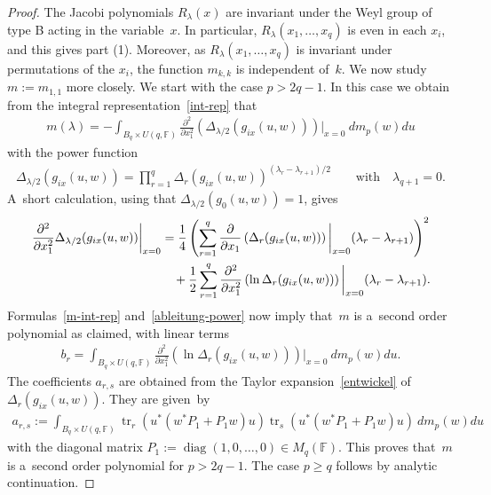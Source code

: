 \documentclass[11pt]{article}
\numberwithin{equation}{section}
\DeclareMathOperator{\diag}{diag}
\begin{document}
\begin{proof}
The Jacobi polynomials $R_\lambda(x)$ are invariant under the Weyl group of type B acting in the variable~$x$.
In particular, $R_\lambda(x_1,\ldots,x_q)$ is even in each $x_i$, and this gives part (1).
Moreover, as $R_\lambda(x_1,\ldots,x_q)$ is invariant under permutations of the $x_i$, the function $m_{k,k}$ is
independent of~$k$.
We now study $m:=m_{1,1}$ more closely.
We start with the case $p> 2q-1$.
In this case we obtain from the integral representation~\eqref{int-rep} that
\begin{gather}
\label{m-int-rep}
m(\lambda)= -\int_{B_q\times U(q,\mathbb F)} \frac{\partial^2}{\partial x_1^2}\left(\Delta_{\lambda/2}(g_{ix}(u,w))\right)\bigg|_{x=0}\> dm_p(w)du
\end{gather}
with the power function
\begin{gather*}
\Delta_{\lambda/2}(g_{ix}(u,w)) =\prod\limits_{r=1}^q \Delta_r(g_{ix}(u,w))^{(\lambda_r-\lambda_{r+1})/2}
\qquad
\text{with}
\quad
\lambda_{q+1}=0.
\end{gather*}
A~short calculation, using that $\Delta_{\lambda/2}(g_0(u,w))=1$, gives
\begin{gather}
\frac{\partial^2}{\partial x_1^2} \Delta_{\lambda/2}(g_{ix}(u,w))\bigg|_{x=0}
=\frac{1}{4} \left(\sum\limits_{r=1}^q\frac{\partial}{\partial x_1}\left(\Delta_r(g_{ix}(u,w))\right)\bigg|_{x=0}
 (\lambda_r-\lambda_{r+1})\right)^2
\nonumber
\\
\hphantom{\frac{\partial^2}{\partial x_1^2} \Delta_{\lambda/2}(g_{ix}(u,w))\bigg|_{x=0}=}{}
+\frac{1}{2}\sum\limits_{r=1}^q \frac{\partial^2}{\partial x_1^2} \left(\ln \Delta_r(g_{ix}(u,w))\right)\bigg|_{x=0}
  (\lambda_r-\lambda_{r+1}).
\label{ableitung-power}
\end{gather}
Formulas~\eqref{m-int-rep} and~\eqref{ableitung-power} now imply that~$m$ is a~second order polynomial as claimed, with
linear terms
\begin{gather*}
b_r= \int_{B_q\times U(q,\mathbb F)} \frac{\partial^2}{\partial x_1^2} \left(\ln\Delta_r(g_{ix}(u,w))\right)\bigg|_{x=0}\> dm_p(w)du.
\end{gather*}
The coef\/f\/icients $a_{r,s}$ are obtained from the Taylor expansion~\eqref{entwickel} of $\Delta_r(g_{ix}(u,w))$. They are
given~by
\begin{gather}
\label{a_rs}
a_{r,s}:= \int_{B_q\times U(q,\mathbb F)} \operatorname{tr}_r(u^{*}(w^*P_1+ P_1  w)u) \operatorname{tr}_s(u^{*}(w^*P_1+ P_1  w)u)\>dm_p(w)du
\end{gather}
with the diagonal matrix $P_1:=\diag(1,0,\ldots,0)\in M_q(\mathbb F)$.
This proves that~$m$ is a~second order polynomial for $p>2q-1$.
The case $p\ge q$ follows by analytic continuation.


\end{proof}
\end{document}
